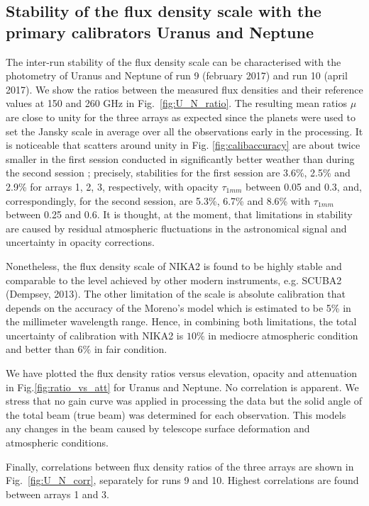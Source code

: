 \subsection{Stability of the flux density scale with the primary calibrators Uranus and Neptune }

The inter-run stability of the flux density scale
can be characterised with  the photometry of Uranus and Neptune of run 9 (february 2017) and run 10 (april 2017).
We show the ratios between the measured flux densities
and their reference values at 150 and 260 GHz in Fig.~\ref{fig:U_N_ratio}.  
The resulting mean ratios $\mu$
are close to unity for the three arrays as expected since
the planets were used to set the Jansky scale in average over all the observations early in the processing. It is noticeable
that scatters around unity in Fig. \ref{fig:calibaccuracy}
are about twice smaller in the first session conducted in significantly better weather than during the second session ;
precisely, stabilities for the first session
are 3.6\%, 2.5\% and 2.9\% for arrays 1, 2, 3, respectively, with opacity $\tau_{1mm}$ between 0.05 and 0.3,
and, correspondingly, for the second session, are  5.3\%, 6.7\% and 8.6\%  with  $\tau_{1mm}$ between 0.25 and 0.6.
It is thought, at the moment, that limitations in stability are caused by residual atmospheric fluctuations
in the astronomical signal and uncertainty in opacity corrections.

Nonetheless, the flux density scale of NIKA2 is found to be highly stable and comparable to the level achieved
by other modern instruments, e.g. SCUBA2 (Dempsey, 2013).
The other limitation of the scale is absolute calibration that depends on the
accuracy of the Moreno's model which is estimated to be 5\% in the millimeter wavelength range. Hence, in combining
both limitations,
the total uncertainty of calibration with NIKA2 is $10\%$ in mediocre atmospheric condition and better than $6\%$
in fair condition.

We have plotted the flux density ratios versus elevation, opacity and attenuation in  Fig.\ref{fig:ratio_vs_att} for Uranus and
Neptune. No correlation is apparent. We stress that no gain curve was applied in processing the data but
the solid angle of the total beam (true beam) was determined for each observation. This models any changes
in the beam caused by telescope surface deformation and atmospheric conditions.


Finally, correlations between flux density ratios of the three arrays are shown in Fig.~\ref{fig:U_N_corr}, separately
for runs 9 and  10. Highest correlations are found between arrays 1 and 3.


